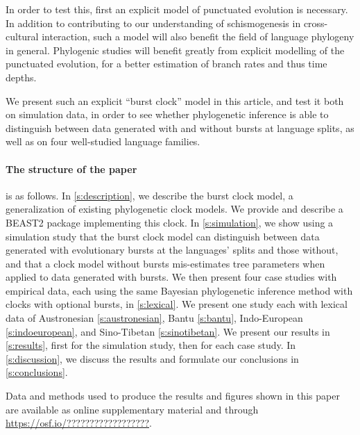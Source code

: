 \documentclass[]{rsos}%
\begin{document}
In order to test this, first an explicit model of punctuated evolution
is necessary. In addition to contributing to our understanding of
schismogenesis in cross-cultural interaction, such a model will also benefit
the field of language phylogeny in general. Phylogenic studies will benefit
greatly from explicit modelling of the punctuated evolution, for a better
estimation of branch rates and thus time depths.

We present such an explicit “burst clock” model in this article, and test it
both on simulation data, in order to see whether phylogenetic inference is able
to distinguish between data generated with and without bursts at language
splits, as well as on four well-studied language families.

\paragraph{The structure of the paper} is as follows. In \cref{s:description},
we describe the burst clock model, a generalization of existing phylogenetic
clock models. We provide and describe a BEAST2 \parencite{drummond2015bayesian}
package implementing this clock. In \cref{s:simulation}, we show using a
simulation study that the burst clock model can distinguish between data
generated with evolutionary bursts at the languages' splits and those without,
and that a clock model without bursts mis-estimates tree parameters when applied
to data generated with bursts. We then present four case studies with empirical
data, each using the same Bayesian phylogenetic inference method with clocks
with optional bursts, in \cref{s:lexical}. We present one study each with
lexical data of Austronesian \ref{s:austronesian}, Bantu \ref{s:bantu},
Indo-European \ref{s:indoeuropean}, and Sino-Tibetan \ref{s:sinotibetan}. We
present our results in \cref{s:results}, first for the simulation study, then
for each case study. In \cref{s:discussion}, we discuss the results and
formulate our conclusions in \cref{s:conclusions}.

Data and methods used to produce the results and figures shown in this paper are
available as online supplementary material and through
\url{https://osf.io/??????????????????}.
\end{document}
